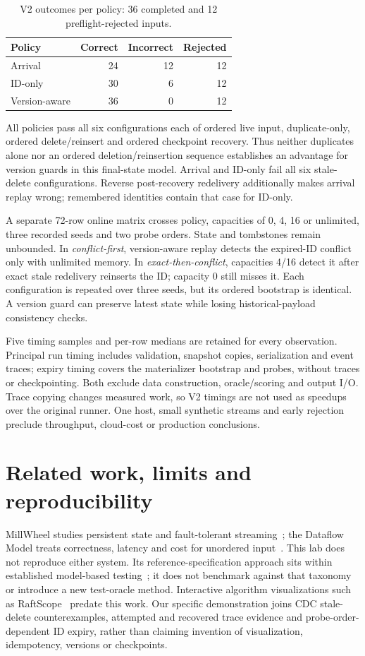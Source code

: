 \documentclass[sigconf,9pt]{acmart}
\begin{document}
\begin{table}[t]
\caption{V2 outcomes per policy: 36 completed and 12 preflight-rejected inputs.}
\label{tab:results}
\centering
\begin{tabular}{lrrr}\toprule
Policy & Correct & Incorrect & Rejected\\\midrule
Arrival & 24 & 12 & 12\\
ID-only & 30 & 6 & 12\\
Version-aware & 36 & 0 & 12\\\bottomrule
\end{tabular}
\end{table}
All policies pass all six configurations each of ordered live input, duplicate-only,
ordered delete/reinsert and ordered checkpoint recovery. Thus neither duplicates
alone nor an ordered deletion/reinsertion sequence establishes an advantage for
version guards in this final-state model. Arrival and ID-only fail all six stale-delete
configurations. Reverse post-recovery redelivery additionally makes arrival replay
wrong; remembered identities contain that case for ID-only.

A separate 72-row online matrix crosses policy, capacities of 0, 4, 16 or unlimited, three
recorded seeds and two probe orders. State and tombstones remain unbounded. In
\emph{conflict-first}, version-aware replay detects the expired-ID conflict only with
unlimited memory. In \emph{exact-then-conflict}, capacities 4/16 detect it after exact
stale redelivery reinserts the ID; capacity 0 still misses it. Each configuration is
repeated over three seeds, but its ordered bootstrap is identical. A version guard
can preserve latest state while losing historical-payload consistency checks.

Five timing samples and per-row medians are retained for every observation. Principal
run timing includes validation, snapshot copies, serialization and event traces;
expiry timing covers the materializer bootstrap and probes, without traces or
checkpointing. Both exclude data construction, oracle/scoring and output I/O. Trace copying changes measured work, so
V2 timings are not used as speedups over the original runner. One host, small synthetic
streams and early rejection preclude throughput, cloud-cost or production conclusions.

\section{Related work, limits and reproducibility}
MillWheel studies persistent state and fault-tolerant streaming~\cite{millwheel}; the
Dataflow Model treats correctness, latency and cost for unordered input~\cite{dataflow}.
This lab does not reproduce either system. Its reference-specification approach sits
within established model-based testing~\cite{mbt}; it does not benchmark against that taxonomy or introduce a new test-oracle method. Interactive
algorithm visualizations such as RaftScope~\cite{raftscope} predate this work. Our
specific demonstration joins CDC stale-delete counterexamples, attempted and recovered
trace evidence and probe-order-dependent ID expiry, rather than claiming invention
of visualization, idempotency, versions or checkpoints.
\end{document}
